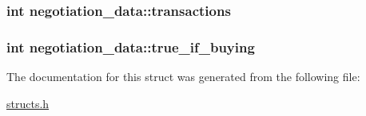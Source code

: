 \hypertarget{structnegotiation__data_af73b88881a030e61e4baca955d841fb8}{
\subsubsection[{transactions}]{\setlength{\rightskip}{0pt plus 5cm}int negotiation\-\_\-data\-::transactions}}\label{structnegotiation__data_af73b88881a030e61e4baca955d841fb8}
\hypertarget{structnegotiation__data_a53aae7f31645cb5fd8bcc86b5a54b00d}{
\subsubsection[{true\-\_\-if\-\_\-buying}]{\setlength{\rightskip}{0pt plus 5cm}int negotiation\-\_\-data\-::true\-\_\-if\-\_\-buying}}\label{structnegotiation__data_a53aae7f31645cb5fd8bcc86b5a54b00d}


The documentation for this struct was generated from the following file\-:\begin{DoxyCompactItemize}
\item 
\hyperlink{structs_8h}{structs.\-h}\end{DoxyCompactItemize}

